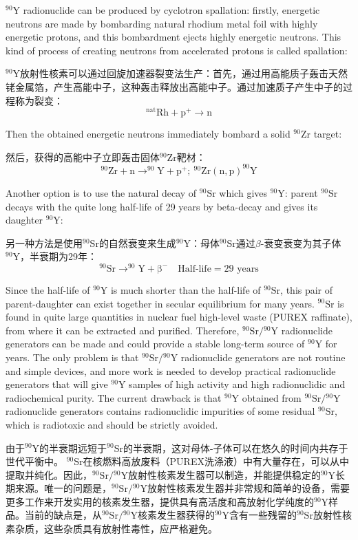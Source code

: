 \documentclass[dvipsnames, svgnames,a4paper,11pt]{article}
\begin{document}
\(\mathrm{^{90}Y}\) radionuclide can be produced by cyclotron spallation: firstly, energetic neutrons are made by bombarding natural rhodium metal foil with highly energetic protons, and this bombardment ejects highly energetic neutrons. This kind of process of creating neutrons from accelerated protons is called spallation:

\(\mathrm{^{90}Y}\)放射性核素可以通过回旋加速器裂变法生产：首先，通过用高能质子轰击天然铑金属箔，产生高能中子，这种轰击释放出高能中子。通过加速质子产生中子的过程称为裂变：
\[
\mathrm{{}^{nat}Rh + p^{+} \to n}
\]

Then the obtained energetic neutrons immediately bombard a solid \(\mathrm{^{90}Zr}\) target:

然后，获得的高能中子立即轰击固体\(\mathrm{^{90}Zr}\)靶材：
\[
\mathrm{^{90}Zr + n \to ^{90}Y + p^{+}; \ ^{90}Zr(n,p)^{90}Y}
\]

Another option is to use the natural decay of \(\mathrm{^{90}Sr}\) which gives \(\mathrm{^{90}Y}\): parent \(\mathrm{^{90}Sr}\) decays with the quite long half-life of 29 years by beta-decay and gives its daughter \(\mathrm{^{90}Y}\):

另一种方法是使用\(\mathrm{^{90}Sr}\)的自然衰变来生成\(\mathrm{^{90}Y}\)：母体\(\mathrm{^{90}Sr}\)通过\(\beta\)-衰变衰变为其子体\(\mathrm{^{90}Y}\)，半衰期为29年：
\[
\mathrm{^{90}Sr \to ^{90}Y + \beta^{-}} \quad \text{Half-life} = 29 \text{ years}
\]

Since the half-life of \(\mathrm{^{90}Y}\) is much shorter than the half-life of \(\mathrm{^{90}Sr}\), this pair of parent-daughter can exist together in secular equilibrium for many years. \(\mathrm{^{90}Sr}\) is found in quite large quantities in nuclear fuel high-level waste (PUREX raffinate), from where it can be extracted and purified. Therefore, \(\mathrm{^{90}Sr}/\mathrm{^{90}Y}\) radionuclide generators can be made and could provide a stable long-term source of \(\mathrm{^{90}Y}\) for years. The only problem is that \(\mathrm{^{90}Sr}/\mathrm{^{90}Y}\) radionuclide generators are not routine and simple devices, and more work is needed to develop practical radionuclide generators that will give \(\mathrm{^{90}Y}\) samples of high activity and high radionuclidic and radiochemical purity. The current drawback is that \(\mathrm{^{90}Y}\) obtained from \(\mathrm{^{90}Sr}/\mathrm{^{90}Y}\) radionuclide generators contains radionuclidic impurities of some residual \(\mathrm{^{90}Sr}\), which is radiotoxic and should be strictly avoided.

由于\(\mathrm{^{90}Y}\)的半衰期远短于\(\mathrm{^{90}Sr}\)的半衰期，这对母体-子体可以在悠久的时间内共存于世代平衡中。 \(\mathrm{^{90}Sr}\)在核燃料高放废料（PUREX洗涤液）中有大量存在，可以从中提取并纯化。因此，\(\mathrm{^{90}Sr}/\mathrm{^{90}Y}\)放射性核素发生器可以制造，并能提供稳定的\(\mathrm{^{90}Y}\)长期来源。唯一的问题是，\(\mathrm{^{90}Sr}/\mathrm{^{90}Y}\)放射性核素发生器并非常规和简单的设备，需要更多工作来开发实用的核素发生器，提供具有高活度和高放射化学纯度的\(\mathrm{^{90}Y}\)样品。当前的缺点是，从\(\mathrm{^{90}Sr}/\mathrm{^{90}Y}\)核素发生器获得的\(\mathrm{^{90}Y}\)含有一些残留的\(\mathrm{^{90}Sr}\)放射性核素杂质，这些杂质具有放射性毒性，应严格避免。
\end{document}
